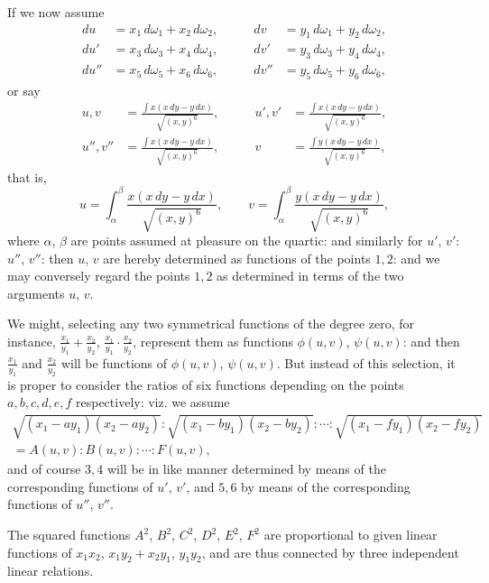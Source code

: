 \documentclass[11pt,a4paper]{book}
\begin{document}
\begin{art}\label{art:155}
If we now assume
\begin{align*}
du &= x_1\,d\omega_1 + x_2\,d\omega_2, &\qquad dv &= y_1\,d\omega_1 + y_2\,d\omega_2, \\
du' &= x_3\,d\omega_3 + x_4\,d\omega_4, &\qquad dv' &= y_3\,d\omega_3 + y_4\,d\omega_4, \\
du'' &= x_5\,d\omega_5 + x_6\,d\omega_6, &\qquad dv'' &= y_5\,d\omega_5 + y_6\,d\omega_6,
\end{align*}
or say
\begin{align*}
u,v &= \frac{\int x(x\,dy - y\,dx)}{\sqrt{(x,y)^6}}, &\qquad
u',v' &= \frac{\int x(x\,dy - y\,dx)}{\sqrt{(x,y)^6}}, \\
u'',v'' &= \frac{\int x(x\,dy - y\,dx)}{\sqrt{(x,y)^6}}, &\qquad
v &= \frac{\int y(x\,dy - y\,dx)}{\sqrt{(x,y)^6}},
\end{align*}
that is,
\[
u = \int_{\alpha}^{\beta} \frac{x(x\,dy - y\,dx)}{\sqrt{(x,y)^6}}, \qquad
v = \int_{\alpha}^{\beta} \frac{y(x\,dy - y\,dx)}{\sqrt{(x,y)^6}},
\]
where $\alpha$, $\beta$ are points assumed at pleasure on the quartic: and similarly for $u'$, $v'$: $u''$, $v''$: then $u$, $v$ are hereby determined as functions of the points $1,2$: and we may conversely regard the points $1,2$ as determined in terms of the two arguments $u$, $v$.

We might, selecting any two symmetrical functions of the degree zero, for instance, $\frac{x_1}{y_1} + \frac{x_2}{y_2}$, $\frac{x_1}{y_1} \cdot \frac{x_2}{y_2}$, represent them as functions $\phi(u,v)$, $\psi(u,v)$: and then $\frac{x_1}{y_1}$ and $\frac{x_2}{y_2}$ will be functions of $\phi(u,v)$, $\psi(u,v)$. But instead of this selection, it is proper to consider the ratios of six functions depending on the points $a,b,c,d,e,f$ respectively: viz. we assume
\begin{multline*}
\sqrt{(x_1-ay_1)(x_2-ay_2)} : \sqrt{(x_1-by_1)(x_2-by_2)} : \cdots : \sqrt{(x_1-fy_1)(x_2-fy_2)} \\
= A(u,v) : B(u,v) : \cdots : F(u,v),
\end{multline*}
and of course $3,4$ will be in like manner determined by means of the corresponding functions of $u'$, $v'$, and $5,6$ by means of the corresponding functions of $u''$, $v''$.

The squared functions $A^2$, $B^2$, $C^2$, $D^2$, $E^2$, $F^2$ are proportional to given linear functions of $x_1x_2$, $x_1y_2+x_2y_1$, $y_1y_2$, and are thus connected by three independent linear relations.
\end{art}
\end{document}
